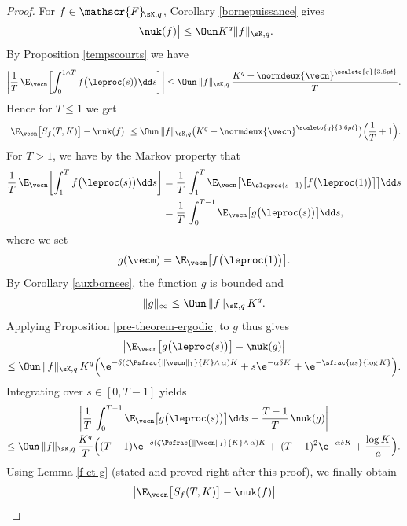 \begin{proof}
For $f\in\mathscr{F}\!_{\sK,q}$, Corollary \ref{bornepuissance} gives
\[
\big|\nuk(f)\big| \leq \Oun K^q \|f\|_{\sK,q}.
\]
By Proposition \ref{tempscourts} we have
\[
\biggl|\frac{1}{T}\,\E_{\vecn}
\biggl[\int_{0}^{1\wedge T}f\bigl(\leproc(s)\bigr)\dd s\biggr]\biggr|\le \Oun\, \|f\|_{\sK,q}\, \frac{K^{q}+\normdeux{\vecn}^{\scaleto{q}{3.6pt}}}{T}.
\]
Hence for $T\le 1$ we get
\[
\left|\E_{\vecn}\bigl[S_{f}(T,K)\bigr]-\nuk(f)\right|\le \Oun\, \|f\|_{\sK,q}\bigl(K^{q}
+\normdeux{\vecn}^{\scaleto{q}{3.6pt}}\bigr)
\Bigl(\frac{1}{T}+1\Bigr).
\]
For $T>1$, we have by the Markov property that
\begin{align*}
\frac{1}{T}\,\E_{\vecn}\biggl[\int_{1}^{T}
f\bigl(\leproc(s)\bigr)\dd s\biggr]
&=\frac{1}{T}\,\int_{1}^{T}\E_{\vecn}\bigl[\E_{\sleproc(s-1)}\bigl[f\bigl(\leproc(1)\bigr)\bigr]\bigr]\dd s\\
& =\frac{1}{T}\,\int_{0}^{T-1}\E_{\vecn}\bigl[g\bigl(\leproc(s)\bigr)\bigr]\dd s,
\end{align*}
where we set
\begin{equation}\label{def-g}
g(\vecm)=\E_{\vecm}\bigl[f\bigl(\leproc(1)\bigr)\bigr].
\end{equation}
By Corollary \ref{auxbornees}, the function $g$ is bounded and
\begin{equation}\label{ginfini}
\|g\|_{\infty}\le \Oun\, \|f\|_{\sK,q}\,K^{q}.
\end{equation}
Applying Proposition \ref{pre-theorem-ergodic} to $g$ thus gives
\begin{multline*}
\left|\E_{\vecn}\bigl[g\bigl(\leproc(s)\bigr)\bigr]-\nuk(g)\right|\\
\le \Oun\, \|f\|_{\sK,q}\, K^q \Bigl(\e^{-\delta\left(\zeta\Psfrac{\|\vecn\|_{1}}{K}\wedge\,\alpha\right)K}
+s\e^{-\alpha\delta K}+\e^{-\sfrac{a s}{\log K}}\Bigr).
\end{multline*}
Integrating over $s\in [0,T-1]$ yields
\begin{multline*}
\biggl| \frac{1}{T}\,\int_{0}^{T-1}\E_{\vecn}\bigl[g\bigl(\leproc(s)\bigr)\bigr]\dd s - \frac{T-1}{T}\, \nuk(g)\biggr|\\
\leq \Oun\, \|f\|_{\sK,q} \,\frac{K^q}{T}\Bigl((T-1)\e^{-\delta\left(\zeta\Psfrac{\|\vecn\|_{1}}{K}\wedge\,\alpha\right)K}
+\,(T-1)^2\e^{-\alpha\delta K}+\frac{\log K}{a}\Bigr).
\end{multline*}
Using Lemma \ref{f-et-g} (stated and proved right after this proof), we finally obtain
\begin{align*}
\bigl|\E_{\vecn}\bigl[&S_{f}(T,K)\bigr]-\nuk(f)\bigr|\\

\end{align*}
\end{proof}
